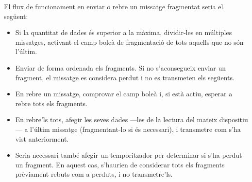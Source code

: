 \documentclass{tfgitic}[2024/07/01]
\begin{document}
{El flux de funcionament en enviar o rebre un missatge fragmentat seria el següent:
\begin{itemize}
    \item Si la quantitat de dades és superior a la màxima, dividir-les en múltiples missatges, activant el camp boleà de fragmentació de tots aquells que no són l'últim.
    \item Enviar de forma ordenada els fragments. Si no s'aconsegueix enviar un fragment, el missatge es considera perdut i no es transmeten els següents.
    \item En rebre un missatge, comprovar el camp boleà i, si està actiu, esperar a rebre tots els fragments. 
    \item En rebre'ls tots, afegir les seves dades ---les de la lectura del mateix dispositiu--- a l'últim missatge (fragmentant-lo si és necessari), i transmetre com s'ha vist anteriorment.
    \item Seria necessari també afegir un temporitzador per determinar si s'ha perdut un fragment. En aquest cas, s'haurien de considerar tots els fragments prèviament rebuts com a perduts, i no transmetre'ls.
\end{itemize}

\begin{figure}
    \centering
    \setlength{\extrarowheight}{0pt}
    \addtolength{\extrarowheight}{\aboverulesep}
    \addtolength{\extrarowheight}{\belowrulesep}
    \setlength{\aboverulesep}{0pt}
    \setlength{\belowrulesep}{0pt}
\end{figure}}
\end{document}
